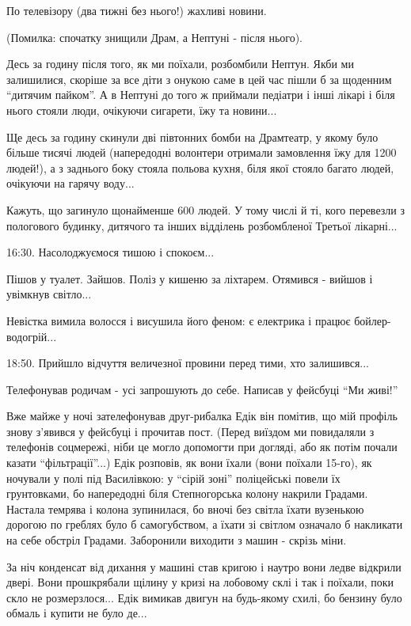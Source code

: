 По телевізору (два тижні без нього!) жахливі новини. 

(Помилка: спочатку знищили Драм, а Нептуні - після нього).

Десь за годину після того, як ми поїхали, розбомбили Нептун. Якби ми
залишилися, скоріше за все діти з онукою саме в цей час пішли б за щоденним
\enquote{дитячим пайком}. А в Нептуні до того ж приймали педіатри і інші лікарі і біля
нього стояли люди, очікуючи сигарети, їжу та новини... 

Ще десь за годину скинули дві півтонних бомби на Драмтеатр, у якому було більше
тисячі людей (напередодні волонтери отримали замовлення їжу для 1200 людей!),
а з заднього боку стояла польова кухня, біля якої стояло багато людей, очікуючи
на гарячу воду... 

Кажуть, що загинуло щонайменше 600 людей. У тому числі й ті, кого перевезли з
пологового будинку, дитячого та інших відділень розбомбленої Третьої лікарні...

16:30. Насолоджуємося тишою і спокоєм...

Пішов у туалет. Зайшов. Поліз у кишеню за ліхтарем. Отямився - вийшов і
увімкнув світло...

Невістка вимила волосся і висушила його феном: є електрика і працює
бойлер-водогрій...

18:50. Прийшло відчуття величезної провини перед тими, хто залишився...

Телефонував родичам - усі запрошують до себе. Написав у фейсбуці \enquote{Ми живі!} 

Вже майже у ночі зателефонував друг-рибалка Едік він помітив, що мій профіль
знову з'явився у фейсбуці і прочитав пост. (Перед виїздом ми повидаляли з
телефонів соцмережі, ніби це могло допомогти при догляді, або як потім почали
казати \enquote{фільтрації}...) Едік розповів, як вони їхали (вони поїхали 15-го), як
ночували у полі під Василівкою: у \enquote{сірій зоні} поліцейські повели їх
грунтовками, бо напередодні біля Степногорська колону накрили Градами. Настала
темрява і колона зупинилася, бо вночі без світла їхати вузенькою дорогою по
греблях було б самогубством, а їхати зі світлом означало б накликати на себе
обстріл Градами. Заборонили виходити з машин - скрізь міни.

За ніч конденсат від дихання у машині став кригою і наутро вони ледве відкрили
двері. Вони прошкрябали щілину у кризі на лобовому склі і так і поїхали, поки
скло не розмерзлося... Едік вимикав двигун на будь-якому схилі, бо бензину було
обмаль і купити не було де...

